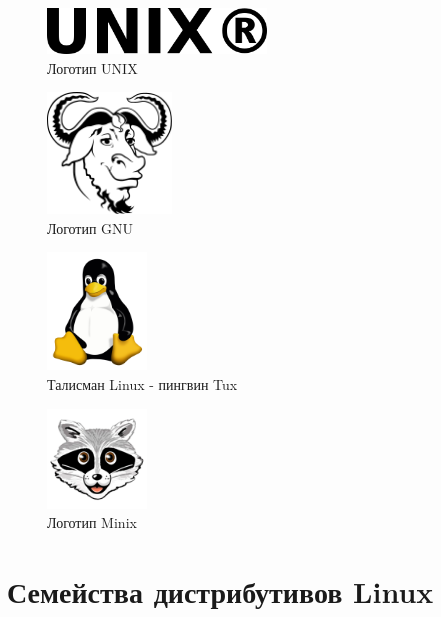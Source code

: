 \documentclass[bachelor, och, referat, times]{SCWorks}
\begin{document}
\begin{figure}[h]
    \centering
    \includegraphics[width=220px]{UNIX.png}
    \caption{Логотип UNIX}
    \label{fig:UNIX_symbol}
\end{figure}

\begin{figure}[h]
    \centering
    \includegraphics[width=125px]
    {128px-Heckert_GNU_white.png}
    \caption{Логотип GNU}
    \label{fig:GNU_symbol}
\end{figure}

\begin{figure}[t]
    \centering
    \includegraphics[width=100px]{Tux.png}
    \caption{Талисман Linux - пингвин Tux}
    \label{fig:linux_symbol}
\end{figure}

\begin{figure}[t]
    \centering
    \includegraphics[width=100px]{BVXyPwe.png}
    \caption{Логотип Minix}
    \label{fig:minix_symbol}
\end{figure}

\section{Семейства дистрибутивов Linux}
\end{document}
